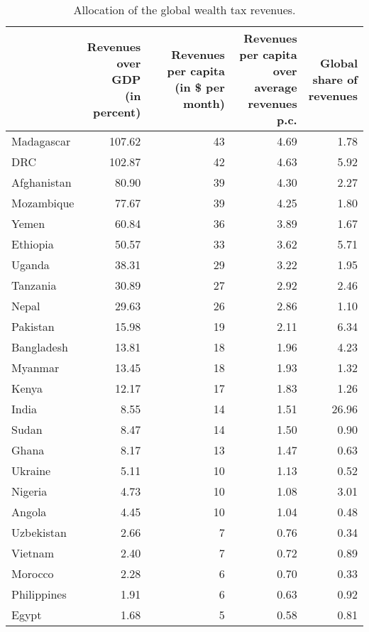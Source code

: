 
\begin{longtable}[t]{lrrrr}
\caption{\label{tab:allocation}Allocation of the global wealth tax revenues.}\\
\toprule
  & \makecell{Revenues\\over GDP\\(in percent)} & \makecell{Revenues\\per capita\\(in \$ per month)} & \makecell{Revenues per capita\\over average\\revenues p.c.} & \makecell{Global\\share of\\revenues}\\
\midrule
Madagascar & 107.62 & 43 & 4.69 & 1.78\\
DRC & 102.87 & 42 & 4.63 & 5.92\\
Afghanistan & 80.90 & 39 & 4.30 & 2.27\\
Mozambique & 77.67 & 39 & 4.25 & 1.80\\
Yemen & 60.84 & 36 & 3.89 & 1.67\\
Ethiopia & 50.57 & 33 & 3.62 & 5.71\\
Uganda & 38.31 & 29 & 3.22 & 1.95\\
Tanzania & 30.89 & 27 & 2.92 & 2.46\\
Nepal & 29.63 & 26 & 2.86 & 1.10\\
Pakistan & 15.98 & 19 & 2.11 & 6.34\\
Bangladesh & 13.81 & 18 & 1.96 & 4.23\\
Myanmar & 13.45 & 18 & 1.93 & 1.32\\
Kenya & 12.17 & 17 & 1.83 & 1.26\\
India & 8.55 & 14 & 1.51 & 26.96\\
Sudan & 8.47 & 14 & 1.50 & 0.90\\
Ghana & 8.17 & 13 & 1.47 & 0.63\\
Ukraine & 5.11 & 10 & 1.13 & 0.52\\
Nigeria & 4.73 & 10 & 1.08 & 3.01\\
Angola & 4.45 & 10 & 1.04 & 0.48\\
Uzbekistan & 2.66 & 7 & 0.76 & 0.34\\
Vietnam & 2.40 & 7 & 0.72 & 0.89\\
Morocco & 2.28 & 6 & 0.70 & 0.33\\
Philippines & 1.91 & 6 & 0.63 & 0.92\\
Egypt & 1.68 & 5 & 0.58 & 0.81\\

\end{longtable}
